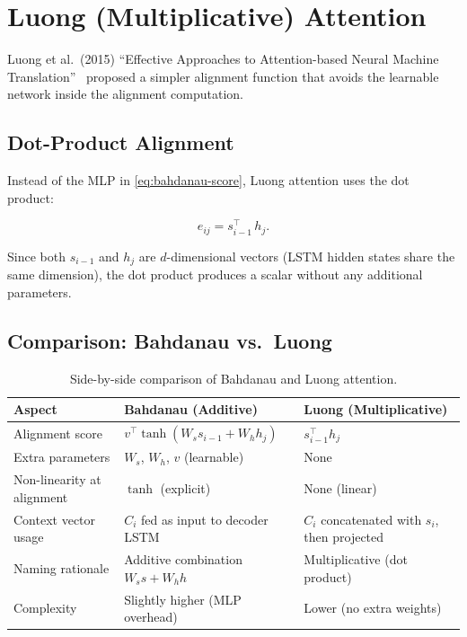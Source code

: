 \documentclass[12pt,a4paper]{article}
\begin{document}
\section{Luong (Multiplicative) Attention}
\label{sec:luong}

Luong et al.\ (2015) ``Effective Approaches to Attention-based Neural
Machine Translation''~\cite{luong2015} proposed a simpler alignment
function that avoids the learnable network inside the alignment
computation.

\subsection{Dot-Product Alignment}

Instead of the MLP in \cref{eq:bahdanau-score}, Luong attention uses
the dot product:

\begin{equation}
  e_{ij} = s_{i-1}^{\top}\, h_j.
  \label{eq:luong-score}
\end{equation}

Since both $s_{i-1}$ and $h_j$ are $d$-dimensional vectors (LSTM
hidden states share the same dimension), the dot product produces a
scalar without any additional parameters.

\subsection{Comparison: Bahdanau vs.\ Luong}

\begin{table}[ht]
\centering
\caption{Side-by-side comparison of Bahdanau and Luong attention.}
\label{tab:attn-comparison}
\begin{tabular}{@{}p{3.5cm}p{5cm}p{5cm}@{}}
\toprule
\textbf{Aspect} & \textbf{Bahdanau (Additive)} & \textbf{Luong (Multiplicative)} \\
\midrule
Alignment score
  & $v^{\top}\tanh(W_s s_{i-1} + W_h h_j)$
  & $s_{i-1}^{\top} h_j$ \\[6pt]
Extra parameters
  & $W_s$, $W_h$, $v$ (learnable)
  & None \\[6pt]
Non-linearity at alignment
  & $\tanh$ (explicit)
  & None (linear) \\[6pt]
Context vector usage
  & $C_i$ fed as input to decoder LSTM
  & $C_i$ concatenated with $s_i$, then projected \\[6pt]
Naming rationale
  & Additive combination $W_s s + W_h h$
  & Multiplicative (dot product) \\[6pt]
Complexity
  & Slightly higher (MLP overhead)
  & Lower (no extra weights) \\
\bottomrule
\end{tabular}
\end{table}
\end{document}
